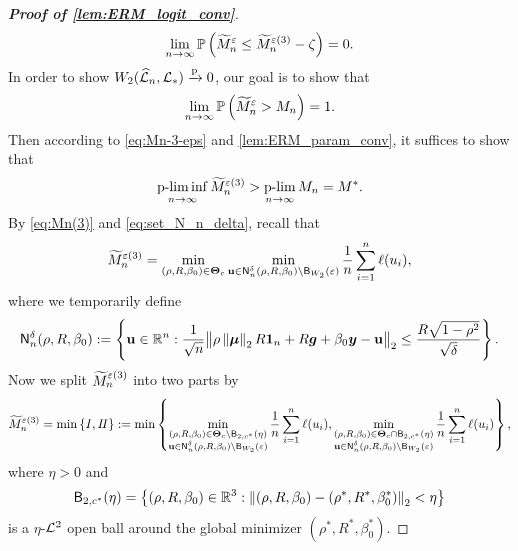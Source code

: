 \begin{proof}[\textbf{Proof of \cref{lem:ERM_logit_conv}}]
\begin{equation}
    \label{eq:Mn-3-eps}
    \lim_{n \to \infty} \mathbb{P} \, \Bigl( \widetilde M_n^\varepsilon \le \widetilde M_n^{\varepsilon(3)} - \zeta \Bigr) = 0.
\end{equation}
In order to show $W_2( \widehat {\mathcal{L}}_{n}, \mathcal{L}_* ) \xrightarrow{\mathrm{p}} 0$, our goal is to show that
\begin{equation*}
    \lim_{n \to \infty} \mathbb{P} \, \Bigl( \widetilde M_n^{\varepsilon} > M_n \Bigr) = 1.
\end{equation*}
Then according to \cref{eq:Mn-3-eps} and \cref{lem:ERM_param_conv}, it suffices to show that
\begin{equation}
    \label{eq:ERM_logit_goal}
    \operatorname*{p-lim\, inf}_{n \to \infty} \widetilde M_n^{\varepsilon(3)}  > \operatorname*{p-lim}_{n \to \infty} M_n = M^*.
\end{equation}
By \cref{eq:Mn(3)} and \eqref{eq:set_N_n_delta}, recall that
\begin{equation*}
    \widetilde M_n^{\varepsilon(3)} = \min_{ (\rho, R, \beta_0) \in \text{\boldmath $\Theta$}_{c} }
    \min_{\mathrm{\bf u} \in 
    \mathsf{N}^\delta_n(\rho, R, \beta_0) \setminus \mathsf{B}_{W_2}(\varepsilon) } 
    \frac1n \sum_{i=1}^n \ell(u_i),
\end{equation*}
where we temporarily define
\begin{equation*}
    \mathsf{N}^\delta_n(\rho, R, \beta_0) := \left\{
        \mathrm{\bf u} \in \mathbb{R}^n: 
        \frac{1}{\sqrt{n}} \bigl\| \rho\left\|{{\boldsymbol{\mu}}}\right\|_2 R \mathrm{\bf 1}_n + R {\boldsymbol{g}} + \beta_0 \text{\boldmath $y$} - \mathrm{\bf u} \bigr\|_2
        \le \frac{R \sqrt{1 - \rho^2}}{\sqrt{\delta}}
     \right\}.
\end{equation*}
Now we split $\widetilde M_n^{\varepsilon(3)}$ into two parts by
\begin{equation*}
    \widetilde M_n^{\varepsilon(3)} 
    = \min\left\{ I, I\!I \right\}
    := \min\left\{ 
        \min_{ \substack{ (\rho, R, \beta_0) \in \text{\boldmath $\Theta$}_{c} \setminus \mathsf{B}_{2,c^*}(\eta)
     \\ \mathrm{\bf u} \in 
    \mathsf{N}^\delta_n(\rho, R, \beta_0) \setminus \mathsf{B}_{W_2}(\varepsilon)  } } 
    \frac1n \sum_{i=1}^n \ell(u_i)
    ,
        \min_{ \substack{ (\rho, R, \beta_0) \in \text{\boldmath $\Theta$}_{c} \cap \mathsf{B}_{2,c^*}(\eta)
     \\ \mathrm{\bf u} \in 
    \mathsf{N}^\delta_n(\rho, R, \beta_0) \setminus \mathsf{B}_{W_2}(\varepsilon)  } } 
    \frac1n \sum_{i=1}^n \ell(u_i)
     \right\},
\end{equation*}
where $\eta > 0$ and
\begin{equation*}
\mathsf{B}_{2,c^*}(\eta) = \left\{ (\rho, R, \beta_0) \in \mathbb{R}^3 : \left\|{(\rho, R, \beta_0) - (\rho^*, R^*, \beta^*_0)}\right\|_2 < \eta \right\}
\end{equation*}
is a $\eta$-$\mathcal{L}^2$ open ball around the global minimizer $(\rho^*, R^*, \beta^*_0)$.


\end{proof}
